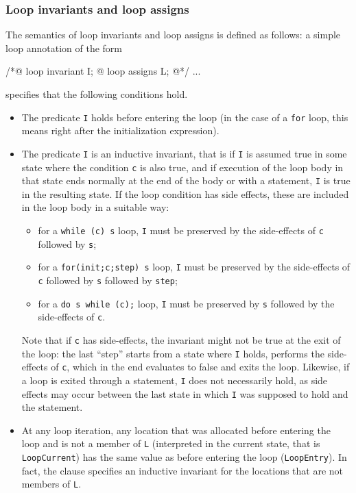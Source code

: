 \subsubsection{Loop invariants and loop assigns}
\label{sec:loop-invariants}
The semantics of loop invariants and loop assigns is defined as follows:
a simple loop annotation of the form
\begin{listing}{1}
/*@ loop invariant I;
  @ loop assigns L;
  @*/
...
\end{listing}
specifies that the following conditions hold.
\begin{itemize}
\item The predicate \lstinline|I| holds before entering the loop
  (in the case of a
  \lstinline|for| loop, this means right after the initialization expression).
\item The predicate \lstinline|I| is an inductive invariant, that is
  if \lstinline|I| is assumed true in some state where the condition
  \lstinline|c| is also true, and if execution of the loop body in
  that state ends normally at the end of the body or with a
  \Continue statement, \lstinline|I| is true in the
  resulting state.
  If the loop condition has side effects, these are
  included in the loop body in a suitable way:
  \begin{itemize}
  \item for a \lstinline|while (c) s| loop, \lstinline|I| must be
    preserved by the side-effects of \lstinline|c| followed by
    \lstinline|s|;
  \item for a \lstinline|for(init;c;step) s| loop, \lstinline|I| must
    be preserved by the side-effects of \lstinline|c| followed by
    \lstinline|s| followed by \lstinline|step|;
  \item for a \lstinline|do s while (c);| loop, \lstinline|I| must be
    preserved by \lstinline|s| followed by the side-effects of
    \lstinline|c|.
  \end{itemize}
Note that if \lstinline|c| has side-effects, the invariant might not
be true at the exit of the loop: the last ``step'' starts from a state
where \lstinline|I| holds, performs the side-effects of \lstinline|c|,
which in the end evaluates to false and exits the loop. Likewise, if a
loop is exited through a \Break statement, \lstinline|I|
does not necessarily hold, as side effects may occur between
the last state in which \lstinline|I| was supposed to hold and
the \Break statement.

\item At any loop iteration, any location that was allocated before
  entering the loop and is not a member of \lstinline|L| (interpreted in the
  current state, that is \lstinline|LoopCurrent|) has the same value as
  before entering the loop (\lstinline|LoopEntry|).
  In fact, the \Loop \assigns clause specifies an inductive
  invariant for the locations that are not members of \lstinline|L|.
\end{itemize}

